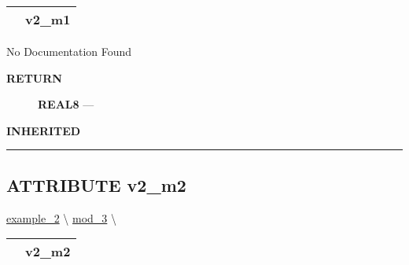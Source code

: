 {\renewcommand{\arraystretch}{1.5}
\begin{tabularx}{\textwidth}{|>{\raggedright\arraybackslash}l|X|}
\hline
\hspace{0pt}\mytexttt{\color{red} } & \textbf{v2\_m1} \\
\hline
\end{tabularx}
}

\par





No Documentation Found








\par
\begin{description}
\item [\colorbox{tagtype}{\color{white} \textbf{\textsf{RETURN}}}] \textbf{REAL8} --- 
\end{description}






\par
\begin{description}
\item [\colorbox{tagtype}{\color{white} \textbf{\textsf{INHERITED}}}] 
\end{description}



\rule{\linewidth}{0.5pt}
\subsection*{\textsf{\colorbox{headtoc}{\color{white} ATTRIBUTE}
v2\_m2}}

\hypertarget{ecldoc:intest.example_2.mod_2.v2_m2}{}
\hspace{0pt} \hyperlink{ecldoc:intest.example_2}{example_2} \textbackslash 
\hspace{0pt} \hyperlink{ecldoc:intest.example_2.mod_3}{mod_3} \textbackslash 

{\renewcommand{\arraystretch}{1.5}
\begin{tabularx}{\textwidth}{|>{\raggedright\arraybackslash}l|X|}
\hline
\hspace{0pt}\mytexttt{\color{red} } & \textbf{v2\_m2} \\
\hline
\end{tabularx}
}

\par





